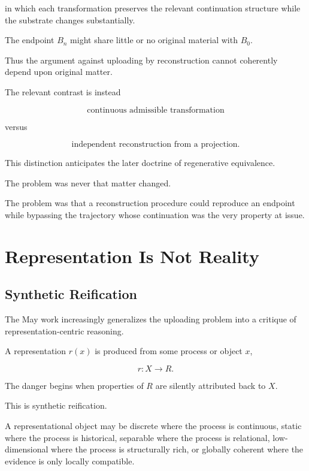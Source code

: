 \documentclass[11pt]{article}
\theoremstyle{remark}
\begin{document}
in which each transformation preserves the relevant continuation structure while the substrate changes substantially.

The endpoint $B_n$ might share little or no original material with $B_0$.

Thus the argument against uploading by reconstruction cannot coherently depend upon original matter.

The relevant contrast is instead

\begin{equation}
\text{continuous admissible transformation}
\end{equation}

versus

\begin{equation}
\text{independent reconstruction from a projection}.
\end{equation}

This distinction anticipates the later doctrine of regenerative equivalence.

The problem was never that matter changed.

The problem was that a reconstruction procedure could reproduce an endpoint while bypassing the trajectory whose continuation was the very property at issue.

\section{Representation Is Not Reality}

\subsection{Synthetic Reification}

The May work increasingly generalizes the uploading problem into a critique of representation-centric reasoning.

A representation $r(x)$ is produced from some process or object $x$,

\begin{equation}
r:X\rightarrow R.
\end{equation}

The danger begins when properties of $R$ are silently attributed back to $X$.

This is synthetic reification.

A representational object may be discrete where the process is continuous, static where the process is historical, separable where the process is relational, low-dimensional where the process is structurally rich, or globally coherent where the evidence is only locally compatible.
\end{document}
